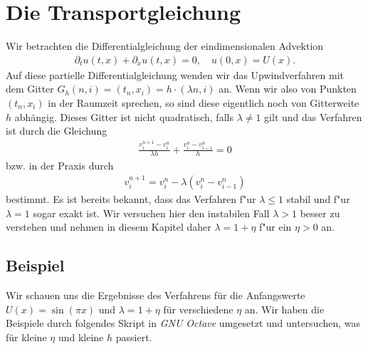 \section{Die Transportgleichung}

Wir betrachten die Differentialgleichung der eindimensionalen Advektion
\begin{align}\label{eq:adv:pde}
\partial_t u(t, x) + \partial_x u(t, x) = 0, \quad u(0, x) = U(x).
\end{align}
Auf diese partielle Differentialgleichung wenden wir das Upwindverfahren mit dem Gitter $G_h(n,i) = (t_n, x_i) = h \cdot (\lambda n, i)$ an.
Wenn wir also von Punkten $(t_n, x_i)$ in der Raumzeit sprechen, so sind diese eigentlich noch von Gitterweite $h$ abhängig. 
Dieses Gitter ist nicht quadratisch, falls $\lambda \neq 1$ gilt und das Verfahren ist durch die Gleichung
\begin{align}\label{eq:adv:scheme_rechnung}
\frac {v^{n+1}_i - v^n_i} {\lambda h} + \frac {v^n_i - v^n_{i-1}} h = 0
\end{align}
bzw. in der Praxis durch
\begin{align}\label{eq:adv:scheme}
v^{n+1}_i = v^n_i - \lambda (v^n_i - v^n_{i-1})
\end{align}
bestimmt.
Es ist bereits bekannt, dass das Verfahren f"ur $\lambda \leq 1$ stabil und f"ur $\lambda = 1$ sogar exakt ist.
Wir versuchen hier den instabilen Fall $\lambda > 1$ besser zu verstehen und nehmen in diesem Kapitel daher $\lambda = 1 + \eta$ f"ur ein $\eta > 0$ an.



\subsection{Beispiel}

Wir schauen uns die Ergebnisse des Verfahrens für die Anfangswerte $U(x) = \sin(\pi x)$ und $\lambda = 1 + \eta$ für verschiedene $\eta$ an.
Wir haben die Beispiele durch folgendes Skript in \emph{GNU Octave} umgesetzt und untersuchen, was für kleine $\eta$ und kleine $h$ passiert.


